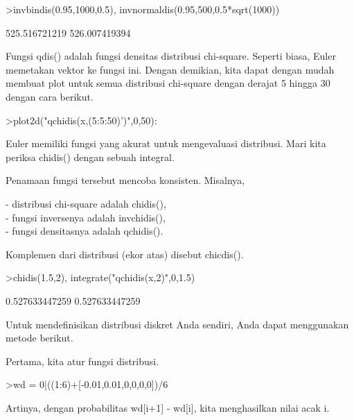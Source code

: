 \documentclass[a4paper,10pt]{article}
\begin{document}
\begin{eulernotebook}
\begin{eulerprompt}
>invbindis(0.95,1000,0.5), invnormaldis(0.95,500,0.5*sqrt(1000))
\end{eulerprompt}
\begin{euleroutput}
  525.516721219
  526.007419394
\end{euleroutput}
\begin{eulercomment}
Fungsi qdis() adalah fungsi densitas distribusi chi-square. Seperti
biasa, Euler memetakan vektor ke fungsi ini. Dengan demikian, kita
dapat dengan mudah membuat plot untuk semua distribusi chi-square
dengan derajat 5 hingga 30 dengan cara berikut.
\end{eulercomment}
\begin{eulerprompt}
>plot2d("qchidis(x,(5:5:50)')",0,50):
\end{eulerprompt}
\begin{eulercomment}
Euler memiliki fungsi yang akurat untuk mengevaluasi distribusi. Mari
kita periksa chidis() dengan sebuah integral.

Penamaan fungsi tersebut mencoba konsisten. Misalnya,

- distribusi chi-square adalah chidis(),\\
- fungsi inversenya adalah invchidis(),\\
- fungsi densitasnya adalah qchidis().

Komplemen dari distribusi (ekor atas) disebut chicdis().
\end{eulercomment}
\begin{eulerprompt}
>chidis(1.5,2), integrate("qchidis(x,2)",0,1.5)
\end{eulerprompt}
\begin{euleroutput}
  0.527633447259
  0.527633447259
\end{euleroutput}
\begin{eulercomment}
Untuk mendefinisikan distribusi diskret Anda sendiri, Anda dapat
menggunakan metode berikut.

Pertama, kita atur fungsi distribusi.
\end{eulercomment}
\begin{eulerprompt}
>wd = 0|((1:6)+[-0.01,0.01,0,0,0,0])/6
\end{eulerprompt}
\begin{euleroutput}
  [0,  0.165,  0.335,  0.5,  0.666667,  0.833333,  1]
\end{euleroutput}
\begin{eulercomment}
Artinya, dengan probabilitas wd[i+1] - wd[i], kita menghasilkan nilai
acak i.


\end{eulercomment}
\end{eulernotebook}
\end{document}
